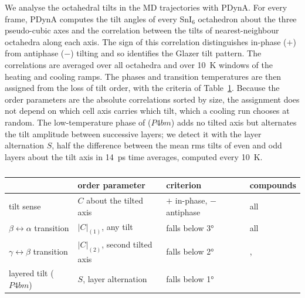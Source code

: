 {\changedcolor
We analyse the octahedral tilts in the MD trajectories with PDynA.\cite{Liang2023PDynA} For every frame, PDynA computes
the tilt angles of every SnI$_6$ octahedron about the three pseudo-cubic axes and the correlation between the tilts of
nearest-neighbour octahedra along each axis. The sign of this correlation distinguishes in-phase ($+$) from antiphase
($-$) tilting and so identifies the Glazer tilt pattern.\cite{Glazer1972} The correlations are averaged over all
octahedra and over \SI{10}{K} windows of the heating and cooling ramps. The phases and transition temperatures are then
assigned from the loss of tilt order, with the criteria of Table~\ref{tab:phaseid}. Because the order parameters are the
absolute correlations sorted by size, the assignment does not depend on which cell axis carries which tilt, which a
cooling run chooses at random. The low-temperature phase of \FASnI{} ($P4bm$) adds no tilted axis but alternates the tilt
amplitude between successive layers; we detect it with the layer alternation $S$, half the difference between the mean
rms tilts of even and odd layers about the tilt axis in \SI{14}{ps} time averages, computed every \SI{10}{K}.
}

\begin{table}[htbp]
  \centering
  \caption{}
  \label{tab:phaseid}
  \small
  \begin{tabular}{llll}
    \toprule
    & order parameter & criterion & compounds \\
    \midrule
    tilt sense & $C$ about the tilted axis & $+$ in-phase, $-$ antiphase & all \\
    $\beta\leftrightarrow\alpha$ transition & $|C|_{(1)}$, any tilt & falls below \ang{3} & all \\
    $\gamma\leftrightarrow\beta$ transition & $|C|_{(2)}$, second tilted axis & falls below \ang{2}
      & \CsSnI{}, \MASnI{} \\
    layered tilt ($P4bm$) & $S$, layer alternation & falls below \ang{1} & \FASnI{} \\
    \bottomrule
  \end{tabular}
\end{table}



